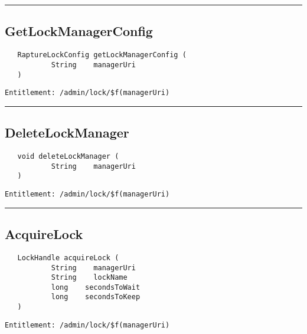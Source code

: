 \rule{12cm}{2pt}
\subsection{GetLockManagerConfig}
\label{Api:GetLockManagerConfig}
\begin{verbatim}
   RaptureLockConfig getLockManagerConfig (
           String    managerUri
   )
\end{verbatim}
\begin{Verbatim}[fontsize=\small, formatcom=\color{Maroon}]
  Entitlement: /admin/lock/$f(managerUri)
\end{Verbatim}



\rule{12cm}{2pt}
\subsection{DeleteLockManager}
\label{Api:DeleteLockManager}
\begin{verbatim}
   void deleteLockManager (
           String    managerUri
   )
\end{verbatim}
\begin{Verbatim}[fontsize=\small, formatcom=\color{Maroon}]
  Entitlement: /admin/lock/$f(managerUri)
\end{Verbatim}



\rule{12cm}{2pt}
\subsection{AcquireLock}
\label{Api:AcquireLock}
\begin{verbatim}
   LockHandle acquireLock (
           String    managerUri
           String    lockName
           long    secondsToWait
           long    secondsToKeep
   )
\end{verbatim}
\begin{Verbatim}[fontsize=\small, formatcom=\color{Maroon}]
  Entitlement: /admin/lock/$f(managerUri)
\end{Verbatim}



